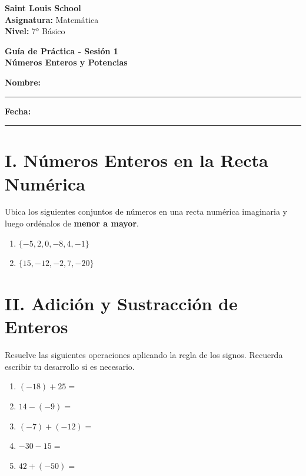 \documentclass[12pt, letterpaper]{article}
\begin{document}
\noindent
\textbf{Saint Louis School} \\
\textbf{Asignatura:} Matemática \\
\textbf{Nivel:} 7° Básico

\vspace{0.5cm}

\begin{center}
    \Large \textbf{Guía de Práctica - Sesión 1} \\
    \large \textbf{Números Enteros y Potencias}
\end{center}

\vspace{0.5cm}

\noindent
\textbf{Nombre:} \rule{8cm}{0.4pt} \hfill \textbf{Fecha:} \rule{3cm}{0.4pt}

\vspace{0.8cm}

\section*{I. Números Enteros en la Recta Numérica}
\noindent Ubica los siguientes conjuntos de números en una recta numérica imaginaria y luego ordénalos de \textbf{menor a mayor}.

\begin{enumerate}[label=\alph*)]
    \item $\{-5, 2, 0, -8, 4, -1\}$
    \vspace{0.5cm}
    \item $\{15, -12, -2, 7, -20\}$
\end{enumerate}

\vspace{0.5cm}

\section*{II. Adición y Sustracción de Enteros}
\noindent Resuelve las siguientes operaciones aplicando la regla de los signos. Recuerda escribir tu desarrollo si es necesario.

\begin{enumerate}[label=\alph*)]
    \item $(-18) + 25 = $ \vspace{0.4cm}
    \item $14 - (-9) = $ \vspace{0.4cm}
    \item $(-7) + (-12) = $ \vspace{0.4cm}
    \item $-30 - 15 = $ \vspace{0.4cm}
    \item $42 + (-50) = $
\end{enumerate}
\end{document}
